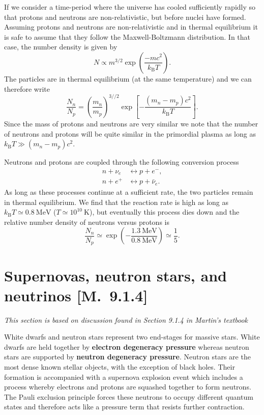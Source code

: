 \documentclass[a4paper,12pt]{article}
\theoremstyle{remark}
\newcommand{\mrm}[1]{\mathrm{#1}}
\renewcommand{\=}[1]{\stackrel{#1}{=}} %
\theoremstyle{plain}
\theoremstyle{definition}
\begin{document}
If we consider a time-period where the universe has cooled sufficiently rapidly so that protons and neutrons are non-relativistic, but before nuclei have formed. Assuming protons and neutrons are non-relativistic and in thermal equilibrium it is safe to assume that they follow the Maxwell-Boltzmann distribution. In that case, the number density is given by
\begin{equation}
N \propto m^{3/2} \exp \left( \frac{-mc^2}{k_\mrm{B} T} \right).
\end{equation}
The particles are in thermal equilibrium (at the same temperature) and we can therefore write
\begin{equation}
\frac{N_n}{N_p} = \left( \frac{m_n}{m_p} \right) ^{3//2} \exp \left[ -\frac{(m_n - m_p)c^2}{k_\mrm{B} T} \right].
\end{equation}
Since the mass of protons and neutrons are very similar we note that the number of neutrons and protons will be quite similar in the primordial plasma as long as $k_\mrm{B} T \gg (m_n - m_p)c^2$.

Neutrons and protons are coupled through the following conversion process
\begin{align}
n + \nu _e &\longleftrightarrow  p + e^-, \\
n + e^+ &\longleftrightarrow p + \bar{\nu}_e.
\end{align}
As long as these processes continue at a sufficient rate, the two particles remain in thermal equilibrium. We find that the reaction rate is high as long as $k_\mrm{B}T \simeq 0.8 \:\mrm{MeV}$ ($T\simeq10^{10}\:\mrm{K}$), but eventually this process dies down and the relative number density of neutrons versus protons is
\begin{equation}
\frac{N_n}{N_p} \simeq \exp \left( - \frac{1.3 \:\mrm{MeV}}{0.8 \:\mrm{MeV}} \right) \simeq \frac{1}{5}. 
\end{equation}

\section{Supernovas, neutron stars, and neutrinos [M.\ 9.1.4]}
\textit{This section is based on discussion found in Section 9.1.4 in Martin's textbook}

White dwarfs and neutron stars represent two end-stages for massive stars. White dwarfs are held together by \textbf{electron degeneracy pressure} whereas neutron stars are supported by \textbf{neutron degeneracy pressure}. Neutron stars are the most dense known stellar objects, with the exception of black holes. Their formation is accompanied with a supernova explosion event which includes a process whereby electrons and protons are squashed together to form neutrons. The Pauli exclusion principle forces these neutrons to occupy different quantum states and therefore acts like a pressure term that resists further contraction.
\end{document}
